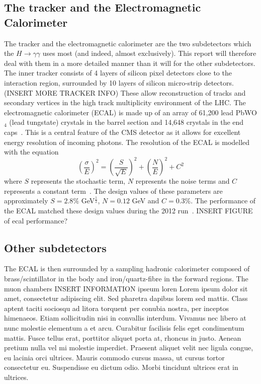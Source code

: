\documentclass[10pt]{article}
\begin{document}
\subsection{The tracker and the Electromagnetic Calorimeter}

The tracker and the electromagnetic calorimeter are the two subdetectors which the $H \rightarrow \gamma \gamma$ uses most (and indeed, almost exclusively). This report will therefore deal with them in a more detailed manner than it will for the other subdetectors.
The inner tracker consists of 4 layers of silicon pixel detectors close to the interaction region, surrounded by 10 layers of silicon micro-strip detectors. (INSERT MORE TRACKER INFO) These allow reconstruction of tracks and secondary vertices in the high track multiplicity environment of the LHC. The electromagnetic calorimeter (ECAL) is made up of an array of 61,200 lead PbWO$_4$ (lead tungstate) crystals in the barrel section and 14,648 crystals in the end caps~\cite{CMSTDR}. This is a central feature of the CMS detector as it allows for excellent energy resolution of incoming photons. The resolution of the ECAL is modelled with the equation \begin{equation} \left( \frac{\sigma}{E}\right) ^2= \left( \frac{S}{\sqrt{E}} \right)^2 + \left( \frac{N}{E} \right)^2 + C^2\end{equation} where $S$ represents the stochastic term, $N$ represents the noise terms and $C$ represents a constant term~\cite{CMSDesign}. The design values of these parameters are approximately $S=2.8\%$ GeV$^\frac{1}{2}$, $ N= 0.12$ GeV and $C=0.3 \%$. The performance of the ECAL matched these design values during the 2012 run~\cite{ECAL2012}. INSERT FIGURE of ecal performance?

\subsection{Other subdetectors}

The ECAL is then surrounded by a sampling hadronic calorimeter composed of brass/scintillator in the body and iron/quartz-fibre in the forward regions. The muon chambers INSERT INFORMATION ipseum loren Lorem ipsum dolor sit amet, consectetur adipiscing elit. Sed pharetra dapibus lorem sed mattis. Class aptent taciti sociosqu ad litora torquent per conubia nostra, per inceptos himenaeos. Etiam sollicitudin nisi in convallis interdum. Vivamus nec libero at nunc molestie elementum a et arcu. Curabitur facilisis felis eget condimentum mattis. Fusce tellus erat, porttitor aliquet porta at, rhoncus in justo. Aenean pretium nulla vel mi molestie imperdiet. Praesent aliquet velit nec ligula congue, eu lacinia orci ultrices. Mauris commodo cursus massa, ut cursus tortor consectetur eu. Suspendisse eu dictum odio. Morbi tincidunt ultrices erat in ultrices. 
\end{document}
